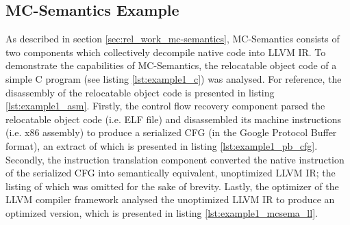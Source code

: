 
\subsection{MC-Semantics Example}
\label{app:mc-semantics_example}

As described in section \ref{sec:rel_work_mc-semantics}, MC-Semantics consists of two components which collectively decompile native code into LLVM IR. To demonstrate the capabilities of MC-Semantics, the relocatable object code of a simple C program (see listing \ref{lst:example1_c}) was analysed. For reference, the disassembly of the relocatable object code is presented in listing \ref{lst:example1_asm}. Firstly, the control flow recovery component parsed the relocatable object code (i.e. ELF file) and disassembled its machine instructions (i.e. x86 assembly) to produce a serialized CFG (in the Google Protocol Buffer format), an extract of which is presented in listing \ref{lst:example1_pb_cfg}. Secondly, the instruction translation component converted the native instruction of the serialized CFG into semantically equivalent, unoptimized LLVM IR; the listing of which was omitted for the sake of brevity. Lastly, the optimizer of the LLVM compiler framework analysed the unoptimized LLVM IR to produce an optimized version, which is presented in listing \ref{lst:example1_mcsema_ll}.






